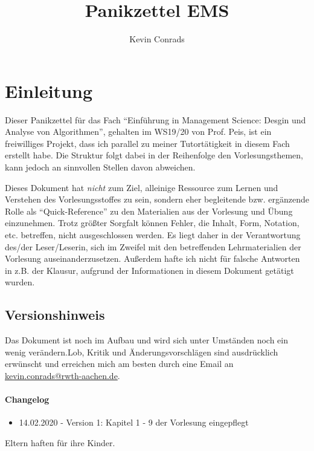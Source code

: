 \documentclass{panikzettel}
\title{Panikzettel EMS}
\author{Kevin Conrads}
\begin{document}
\maketitle

\tableofcontents

\section{Einleitung}
Dieser Panikzettel für das Fach ``Einführung in Management Science: Desgin und Analyse von Algorithmen'', gehalten im WS19/20 von Prof. Peis, ist ein freiwilliges Projekt, dass ich parallel zu meiner Tutortätigkeit in diesem Fach erstellt habe. Die Struktur folgt dabei in der Reihenfolge den Vorlesungsthemen, kann jedoch an sinnvollen Stellen davon abweichen.

Dieses Dokument hat \emph{nicht} zum Ziel, alleinige Ressource zum Lernen und Verstehen des Vorlesungsstoffes zu sein, sondern eher  begleitende bzw. ergänzende Rolle als ``Quick-Reference'' zu den Materialien aus der Vorlesung und Übung einzunehmen. Trotz größter Sorgfalt können Fehler, die Inhalt, Form, Notation, etc. betreffen, nicht ausgeschlossen werden. Es liegt daher in der Verantwortung des/der Leser/Leserin, sich im Zweifel mit den betreffenden Lehrmaterialien der Vorlesung auseinanderzusetzen. Außerdem hafte ich nicht für falsche Antworten in z.B. der Klausur, aufgrund der Informationen in diesem Dokument getätigt wurden.

\subsection{Versionshinweis}
Das Dokument ist noch im Aufbau und wird sich unter Umständen noch ein wenig verändern.Lob, Kritik und Änderungsvorschlägen sind ausdrücklich erwünscht und erreichen mich am besten durch eine Email an \href{mailto:kevin.conrads@rwth-aachen.de}{kevin.conrads@rwth-aachen.de}. 

\paragraph{Changelog}

\begin{itemize}
	\item 14.02.2020 - Version 1: Kapitel 1 - 9 der Vorlesung eingepflegt
\end{itemize}

Eltern haften für ihre Kinder.

\end{document}
